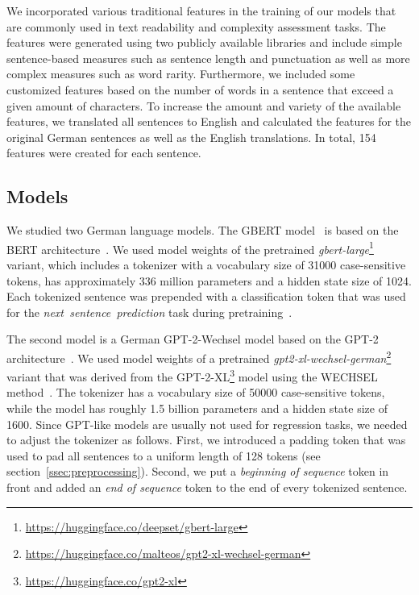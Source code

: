\documentclass[11pt,a4paper]{article}
\begin{document}
We incorporated various traditional features in the training of our models that are commonly used in text readability and complexity assessment tasks.
The features were generated using two publicly available libraries \cite{VanCranenburgh2019, Proisl2022} and include simple sentence-based measures such as sentence length and punctuation as well as more complex measures such as word rarity.
Furthermore, we included some customized features based on the number of words in a sentence that exceed a given amount of characters.
To increase the amount and variety of the available features, we translated all sentences to English and calculated the features for the original German sentences as well as the English translations.
In total, 154 features were created for each sentence.

\subsection{Models}
\label{ssec:models}
We studied two German language models.
The GBERT model~\cite{Chan2020} is based on the BERT architecture~\cite{Devlin2018}.
We used model weights of the pretrained \emph{gbert-large}\footnote{\url{https://huggingface.co/deepset/gbert-large}} variant, which includes a tokenizer with a vocabulary size of 31000 case-sensitive tokens, has approximately 336 million parameters and a hidden state size of 1024.
Each tokenized sentence was prepended with a classification token that was used for the \mbox{\emph{next sentence prediction}} task during pretraining~\cite{Devlin2018}.

The second model is a German \mbox{GPT-2-Wechsel} model \cite{Minixhofer2021} based on the \mbox{GPT-2} architecture~\cite{Radford2019}.
We used model weights of a pretrained \emph{gpt2-xl-wechsel-german}\footnote{\url{https://huggingface.co/malteos/gpt2-xl-wechsel-german}} variant that was derived from the GPT-2-XL\footnote{\url{https://huggingface.co/gpt2-xl}} model \cite{Radford2019} using the WECHSEL method~\cite{Minixhofer2021}.
The tokenizer has a vocabulary size of 50000 case-sensitive tokens, while the model has roughly 1.5 billion parameters and a hidden state size of 1600.
Since GPT-like models are usually not used for regression tasks, we needed to adjust the tokenizer as follows.
First, we introduced a padding token that was used to pad all sentences to a uniform length of 128 tokens (see section~\ref{ssec:preprocessing}).
Second, we put a \emph{beginning of sequence} token in front and added an \emph{end of sequence} token to the end of every tokenized sentence.
\end{document}
